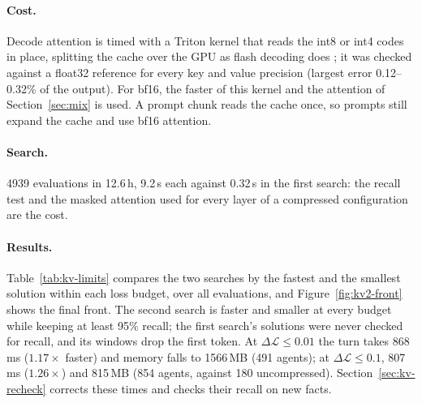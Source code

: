 \documentclass[11pt]{article}
\newcommand{\dloss}{\Delta\mathcal{L}}
\begin{document}
\paragraph{Cost.} Decode attention is timed with a Triton \cite{tillet2019triton} kernel that reads the int8
or int4 codes in place, splitting the cache over the GPU as flash decoding does \cite{dao2023flashdecoding};
it was checked against a float32 reference for every key and value precision (largest error 0.12--0.32\%
of the output). For bf16, the faster of this kernel and the attention of Section~\ref{sec:mix} is used.
A prompt chunk reads the cache once, so prompts still expand the cache and use bf16 attention.

\paragraph{Search.} 4939 evaluations in 12.6\,h, 9.2\,s each against 0.32\,s in the first search: the recall
test and the masked attention used for every layer of a compressed configuration are the cost.

\paragraph{Results.} Table~\ref{tab:kv-limits} compares the two searches by the fastest and the smallest
solution within each loss budget, over all evaluations, and Figure~\ref{fig:kv2-front} shows the final
front. The second search is faster and smaller at every budget while keeping at least 95\% recall; the first
search's solutions were never checked for recall, and its windows drop the first token. At
$\dloss\le0.01$ the turn takes 868\,ms ($1.17\times$ faster) and memory falls to 1566\,MB (491 agents); at
$\dloss\le0.1$, 807\,ms ($1.26\times$) and 815\,MB (854 agents, against 180 uncompressed).
Section~\ref{sec:kv-recheck} corrects these times and checks their recall on new facts.
\end{document}
